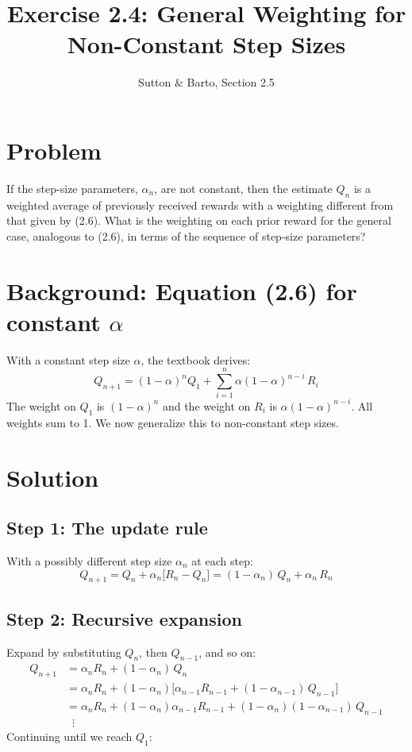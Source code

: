 \documentclass[11pt]{article}
\title{Exercise 2.4: General Weighting for Non-Constant Step Sizes}
\author{Sutton \& Barto, Section 2.5}
\date{}
\begin{document}
\maketitle

\section*{Problem}

If the step-size parameters, $\alpha_n$, are not constant, then the estimate $Q_n$ is a
weighted average of previously received rewards with a weighting different from that
given by (2.6). What is the weighting on each prior reward for the general case,
analogous to (2.6), in terms of the sequence of step-size parameters?

\section*{Background: Equation (2.6) for constant $\alpha$}

With a constant step size $\alpha$, the textbook derives:
\begin{equation}
    Q_{n+1} = (1-\alpha)^n Q_1 + \sum_{i=1}^{n} \alpha(1-\alpha)^{n-i}\, R_i \tag{2.6}
\end{equation}
The weight on $Q_1$ is $(1-\alpha)^n$ and the weight on $R_i$ is $\alpha(1-\alpha)^{n-i}$.
All weights sum to 1. We now generalize this to non-constant step sizes.

\section*{Solution}

\subsection*{Step 1: The update rule}

With a possibly different step size $\alpha_n$ at each step:
\[
    Q_{n+1} = Q_n + \alpha_n\bigl[R_n - Q_n\bigr] = (1 - \alpha_n)\,Q_n + \alpha_n\, R_n
\]

\subsection*{Step 2: Recursive expansion}

Expand by substituting $Q_n$, then $Q_{n-1}$, and so on:
\begin{align*}
    Q_{n+1} &= \alpha_n R_n + (1-\alpha_n)\,Q_n \\
    &= \alpha_n R_n + (1-\alpha_n)\bigl[\alpha_{n-1} R_{n-1} + (1-\alpha_{n-1})\,Q_{n-1}\bigr] \\
    &= \alpha_n R_n + (1-\alpha_n)\alpha_{n-1} R_{n-1}
       + (1-\alpha_n)(1-\alpha_{n-1})\,Q_{n-1} \\
    &\;\;\vdots
\end{align*}
Continuing until we reach $Q_1$:
\end{document}

